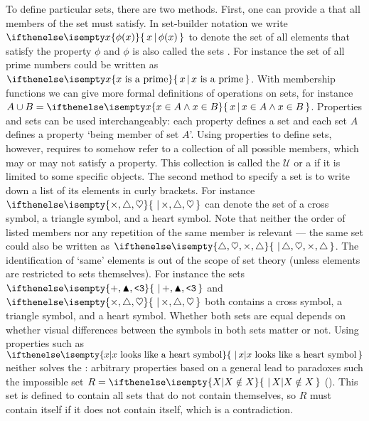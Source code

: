 To define particular sets, there are two methods. First, one can provide a
 that all
members of the set must satisfy.  In set-builder notation we write
$\set[x]{\phi(x)}$ to denote the set of all elements that satisfy the property
$\phi$ and $\phi$ is also called the sets . For
instance the set of all prime numbers could be written as $\set[x]{x~\textrm{is
a prime}}$. With membership functions we can give more formal definitions of
operations on sets, for instance $A \cup B = \set[x]{x \in A \land x \in B}$.
Properties and sets can be used interchangeably: each property
defines a set and each set $A$ defines a property `being member of set $A$'.
Using properties to define sets, however, requires to somehow refer to a
collection of all possible members, which may or may not satisfy a property.
This collection is called the  $\mathcal{U}$ or a
 if it is limited to some specific objects.  The second method
to specify a set is to write down a list of its elements in curly brackets. For
instance $\set{\times, \triangle, \heartsuit }$ can denote the set of a cross
symbol, a triangle symbol, and a heart symbol. Note that neither the order of
listed members nor any repetition of the same member is relevant --- the same
set could also be written as $\set{ \triangle, \heartsuit, \times, \triangle
}$. The identification of `same' elements is out of the scope of set theory
(unless elements are restricted to sets themselves). For instance the sets
$\set{ +, \blacktriangle, \texttt{<3} }$ and $\set{ \times, \triangle,
\heartsuit }$ both contains a cross symbol, a triangle symbol, and a heart
symbol. Whether both sets are equal depends on whether visual differences
between the symbols in both sets matter or not. Using properties such as
$\set{x|x~\textrm{looks like a heart symbol}}$ neither solves the : arbitrary properties based on a general  lead to paradoxes such  the impossible set $R = \set{ X | X \notin X }$
(). This set is defined to contain all sets that do not
contain themselves, so $R$ must contain itself if it does not contain itself,
which is a contradiction. 

